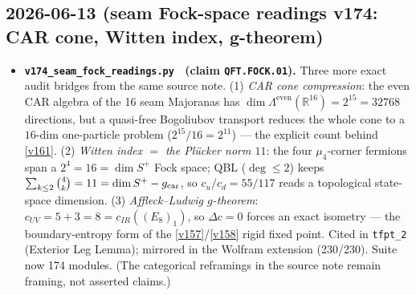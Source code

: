 \subsection*{2026-06-13 (seam Fock-space readings v174: CAR cone, Witten index, g-theorem)}
\begin{itemize}
\item \textbf{\texttt{v174\_seam\_fock\_readings.py} \mE\ (claim \texttt{QFT.FOCK.01}).} Three more
  exact audit bridges from the same source note. (1) \emph{CAR cone compression}: the even CAR
  algebra of the 16 seam Majoranas has $\dim\Lambda^{\mathrm{even}}(\mathbb R^{16})=2^{15}=32768$
  directions, but a quasi-free Bogoliubov transport reduces the whole cone to a $16$-dim
  one-particle problem ($2^{15}/16=2^{11}$) --- the explicit count behind \vref{v161}. (2)
  \emph{Witten index $=$ the Pl\"ucker norm $11$}: the four $\mu_4$-corner fermions span a
  $2^4=16=\dim S^+$ Fock space; QBL ($\deg\le2$) keeps $\sum_{k\le2}\binom4k=11=\dim S^+-g_{\mathrm{car}}$, so
  $c_u/c_d=55/117$ reads a topological state-space dimension. (3) \emph{Affleck--Ludwig $g$-theorem}:
  $c_{UV}=5+3=8=c_{IR}((E_8)_1)$, so $\Delta c=0$ forces an exact isometry --- the boundary-entropy
  form of the \vref{v157}/\vref{v158} rigid fixed point. Cited in \texttt{tfpt\_2} (Exterior Leg
  Lemma); mirrored in the Wolfram extension (230/230). Suite now 174 modules. (The categorical
  reframings in the source note remain framing, not asserted claims.)
\end{itemize}

